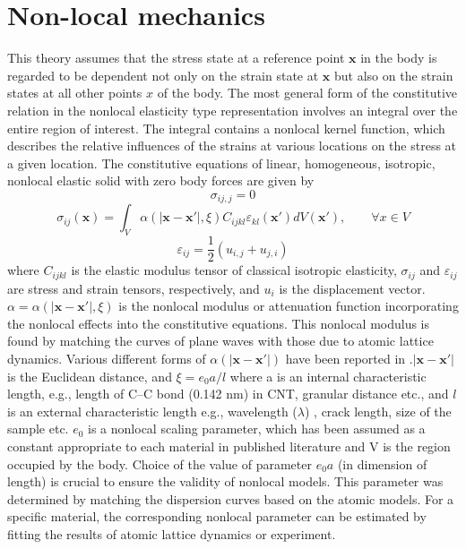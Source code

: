 \section {Non-local mechanics}
This theory assumes that the stress state at a reference point $\mathbf{x}$ in
the body is regarded to be dependent not only on the strain state at
$\mathbf{x}$ but also on the strain states at all other points $x$ of the body. The
most general form of the constitutive relation in the nonlocal
elasticity type representation involves an integral over the entire
region of interest. The integral contains a nonlocal kernel function,
which describes the relative influences of the strains at various
locations on the stress at a given location. The constitutive
equations of linear, homogeneous, isotropic, nonlocal elastic solid
with zero body forces are given by\\
\begin{equation}
\sigma_{ij,j}=0
\end{equation}
\begin{equation}
\sigma_{ij}(\mathbf{x})=\int_V \alpha(|\mathbf{x-x'}|,\xi)C_{ijkl}\varepsilon_{kl}(\mathbf{x'})dV(\mathbf{x'}),\qquad \forall x \in V \label{eqNL}
\end{equation}
\begin{equation}
\varepsilon_{ij}=\frac{1}{2}(u_{i,j}+u_{j,i})
\end{equation}
where $C_{ijkl}$ is the elastic modulus tensor of classical isotropic
elasticity, $\sigma_{ij}$ and $\varepsilon_{ij}$ are stress and strain tensors, respectively,
and $u_i$ is the displacement vector. $\alpha = \alpha(|\mathbf{x-x'}|,\xi)$ is the nonlocal
modulus or attenuation function incorporating the nonlocal effects
into the constitutive equations. This nonlocal modulus is found by
matching the curves of plane waves with those due to atomic lattice
dynamics. Various different forms of $\alpha(|\mathbf{x-x'}|)$ have been reported in \cite{eringen1976nonlocal} .$|\mathbf{x-x'}|$ is the Euclidean distance, and $\xi = e_0 a/l$\cite{peddieson2003application} where a is an internal characteristic length, e.g., length of C–C bond
(0.142 nm) in CNT, granular distance etc., and $l$ is an external
characteristic length e.g., wavelength ($\lambda$) , crack length, size of the
sample etc. $e_0$ is a nonlocal scaling parameter, which has been
assumed as a constant appropriate to each material in published
literature and V is the region occupied by the body. Choice of the
value of parameter $e_0a$  (in dimension of length) is crucial to ensure
the validity of nonlocal models. This parameter was determined by
matching the dispersion curves based on the atomic models\cite{eringen1983differential}. For
a specific material, the corresponding nonlocal parameter can be
estimated by fitting the results of atomic lattice dynamics or
experiment.

